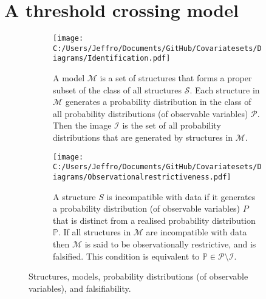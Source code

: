 \documentclass[10pt,a4paper,twoside]{article}
\numberwithin{equation}{subsection}
\begin{document}
\section{A threshold crossing model}
\begin{figure}[p]
\centering
\begin{subfigure}{0.8\textwidth}
  \centering
  \texttt{[image: C:/Users/Jeffro/Documents/GitHub/Covariatesets/Diagrams/Identification.pdf]}
  \caption{A model $\mathcal{M}$ is a set of structures that forms a proper subset of the class of all structures $\mathcal{S}$. Each structure in $\mathcal{M}$ generates a probability distribution in the class of all probability distributions (of observable variables) $\mathcal{P}$. Then the image $\mathcal{I}$ is the set of all probability distributions that are generated by structures in $\mathcal{M}$.}
  \label{fig:model}
  \end{subfigure}
\begin{subfigure}{0.8\textwidth}
  \centering
  \texttt{[image: C:/Users/Jeffro/Documents/GitHub/Covariatesets/Diagrams/Observationalrestrictiveness.pdf]}
  \caption{A structure $S$ is incompatible with data if it generates a probability distribution (of observable variables) $P$ that is distinct from a realised probability distribution $\mathbb{P}$. If all structures in $\mathcal{M}$ are incompatible with data then $\mathcal{M}$ is said to be observationally restrictive, and is falsified. This condition is equivalent to $\mathbb{P}\in\mathcal{P}\setminus\mathcal{I}$.}
  \label{fig:obs.restrict}
  \end{subfigure}
\caption{Structures, models, probability distributions (of observable variables), and falsifiability.}
\label{fig:models}
\end{figure}
\end{document}
